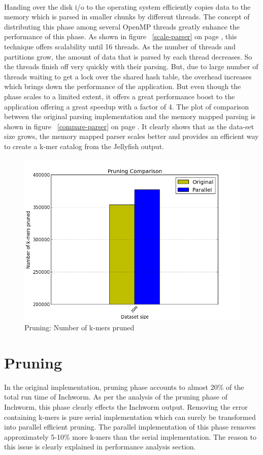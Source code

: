 \label{key}\documentclass[bachinf, english ,zihtitle,final,hyperref,utf8]{zihpub}
\begin{document}
\paragraph{}
Handing over the disk i/o to the operating system efficiently copies data to the memory which is parsed in smaller chunks by different threads. The concept of distributing this phase among several OpenMP threads greatly enhance the performance of this phase. As shown in figure ~\ref{scale-parser} on page \pageref{scale-parser}, this technique offers scalability until 16 threads. As the number of threads and partitions grow, the amount of data that is parsed by each thread decreases. So the threads finish off very quickly with their parsing. But, due to large number of threads waiting to get a lock over the shared hash table, the overhead increases which brings down the performance of the application. But even though the phase scales to a limited extent, it offers a great performance boost to the application offering a great speedup with a factor of 4. The plot of comparison between the original parsing implementation and the memory mapped parsing is shown in figure ~\ref{compare-parser} on page \pageref{compare-parser}. It clearly shows that as the data-set size grows, the memory mapped parser scales better and provides an efficient way to create a k-mer catalog from the Jellyfish output.
\begin{figure}[h]
\center
\includegraphics[scale=0.4]{pruning_compare}
\caption{Pruning: Number of k-mers pruned}
\label{compare-pruningnum}
\end{figure}
\section{Pruning}
In the original implementation, pruning phase accounts to almost 20\% of the total run time of Inchworm. As per the analysis of the pruning phase of Inchworm, this phase clearly effects the Inchworm output. Removing the error containing k-mers is pure serial implementation which can surely be transformed into parallel efficient pruning. The parallel implementation of this phase removes approximately 5-10\% more k-mers than the serial implementation. The reason to this issue is clearly explained in performance analysis section. 
\end{document}
